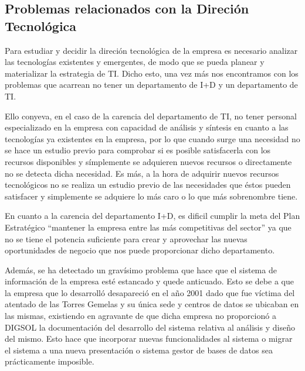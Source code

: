 \subsection{Problemas relacionados con la Direción Tecnológica}

Para estudiar y decidir la direción tecnológica de la
empresa es necesario analizar las tecnologías existentes y emergentes,
de modo que se pueda planear y materializar la estrategia de TI. Dicho
esto, una vez más nos encontramos con los problemas que acarrean no
tener un departamento de I+D y un departamento de TI.

Ello conyeva, en el caso de la carencia del departamento de TI, no
tener personal especializado en la empresa con capacidad de
análisis y síntesis en cuanto a las tecnologías ya existentes en la
empresa, por lo que cuando surge una necesidad no se hace un estudio
previo para comprobar si es posible satisfacerla con los recursos
disponibles y símplemente se adquieren nuevos recursos o directamente
no se detecta dicha necesidad. Es más, a la hora de adquirir nuevos
recursos tecnológicos no se realiza un estudio previo de las
necesidades que éstos pueden satisfacer y simplemente se adquiere lo
más caro o lo que más sobrenombre tiene.

En cuanto a la carencia del departamento I+D, es dificil cumplir la
meta del Plan Estratégico ``mantener la empresa entre las más
competitivas del sector'' ya que no se tiene el potencia suficiente
para crear y aprovechar las nuevas oportunidades de negocio que nos
puede proporcionar dicho departamento.

Además, se ha detectado un gravísimo problema que hace que el sistema
de información de la empresa esté estancado y quede anticuado. Esto se
debe a que la empresa que lo desarrolló desapareció en el año 2001
dado que fue víctima del atentado de las Torres Gemelas y su única
sede y centros de datos se ubicaban en las mismas, existiendo en
agravante de que dicha empresa no proporcionó a DIGSOL la
documentación del desarrollo del sistema relativa al análisis y diseño
del mismo. Esto hace que incorporar nuevas funcionalidades al sistema
o migrar el sistema a una nueva presentación o sistema gestor de bases
de datos sea prácticamente imposible.